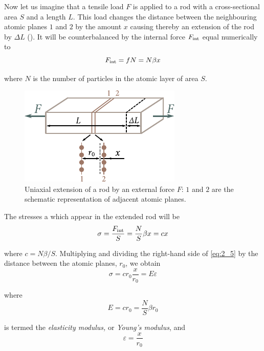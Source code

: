 Now let us imagine that a tensile load $F$ is applied to a rod with a cross-sectional area $S$ and a length $L$. This load changes the distance between the neighbouring atomic planes $1$ and $2$ by the amount $x$ causing thereby an extension of the rod by $\Delta{L}$ (). It will be counterbalanced by the internal force $F_{\text{int}}$ equal numerically to
\begin{equation}\label{eq:2_4}
	F_{\text{int}} = f N = N \beta x
\end{equation}

\noindent
where $N$ is the number of particles in the atomic layer of area $S$.

\begin{figure}[t]
	\begin{center}
		\includegraphics[scale=1.0]{figures/ch_02/fig_2_2.pdf}
		\caption[]{Uniaxial extension of a rod by an external force $F$: $1$ and $2$ are the schematic representation of adjacent atomic planes.}
		\label{fig:2_2}
	\end{center}
	\vspace{-0.7cm}
\end{figure}

The stresses a which appear in the extended rod will be
\begin{equation}\label{eq:2_5}
	\sigma = \frac{F_{\text{int}}}{S} = \frac{N}{S} \beta x = c x
\end{equation}

\noindent
where $c = N\beta/S$. Multiplying and dividing the right-hand side of \eqref{eq:2_5} by the distance between the atomic planes, $r_0$, we obtain
\begin{equation}\label{eq:2_6}
	\sigma = c r_0 \frac{x}{r_0} = E \varepsilon
\end{equation}

\noindent
where
\begin{equation}\label{eq:2_7}
	E = c r_0 = \frac{N}{S} \beta r_0
\end{equation}

\noindent
is termed the \textit{elasticity modulus,} or \textit{Young's modulus}, and
\begin{equation}\label{eq:2_8}
	\varepsilon = \frac{x}{r_0}
\end{equation}

